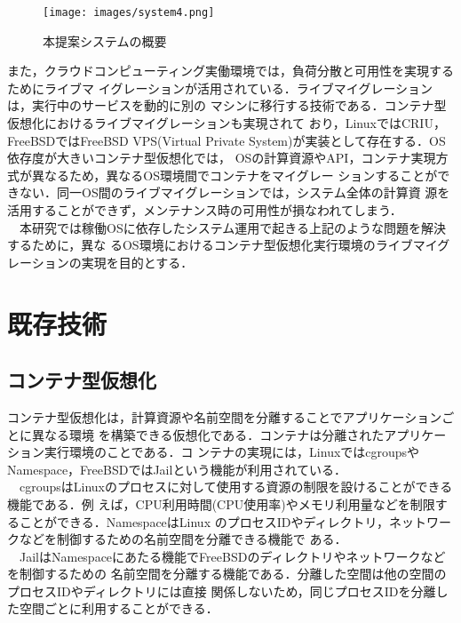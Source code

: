 \documentclass[11pt]{jarticle}
\begin{document}
\begin{figure*}[t]
  \centering
  \texttt{[image: images/system4.png]} \\
  \caption{本提案システムの概要}
  \label{fig:system}
\end{figure*}

また，クラウドコンピューティング実働環境では，負荷分散と可用性を実現するためにライブマ
イグレーションが活用されている．ライブマイグレーションは，実行中のサービスを動的に別の
マシンに移行する技術である．コンテナ型仮想化におけるライブマイグレーションも実現されて
おり，LinuxではCRIU\cite{container_live,criu}，FreeBSDではFreeBSD VPS(Virtual Private
 System)\cite{freebsd-vps}が実装として存在する．OS依存度が大きいコンテナ型仮想化では，
 OSの計算資源やAPI，コンテナ実現方式が異なるため，異なるOS環境間でコンテナをマイグレー
 ションすることができない．同一OS間のライブマイグレーションでは，システム全体の計算資
 源を活用することができず，メンテナンス時の可用性が損なわれてしまう．\\
　本研究では稼働OSに依存したシステム運用で起きる上記のような問題を解決するために，異な
るOS環境におけるコンテナ型仮想化実行環境のライブマイグレーションの実現を目的とする．

\section{既存技術}
\subsection{コンテナ型仮想化}
\label{sec:container}

コンテナ型仮想化は，計算資源や名前空間を分離することでアプリケーションごとに異なる環境
を構築できる仮想化である．コンテナは分離されたアプリケーション実行環境のことである．コ
ンテナの実現には，LinuxではcgroupsやNamespace，FreeBSDではJailという機能が利用されている\cite{cgroups-namespace}\cite{jail}．\\
　cgroupsはLinuxのプロセスに対して使用する資源の制限を設けることができる機能である．例
えば，CPU利用時間(CPU使用率)やメモリ利用量などを制限することができる．NamespaceはLinux
のプロセスIDやディレクトリ，ネットワークなどを制御するための名前空間を分離できる機能で
ある．\\
　JailはNamespaceにあたる機能でFreeBSDのディレクトリやネットワークなどを制御するための
名前空間を分離する機能である．分離した空間は他の空間のプロセスIDやディレクトリには直接
関係しないため，同じプロセスIDを分離した空間ごとに利用することができる．
\end{document}
